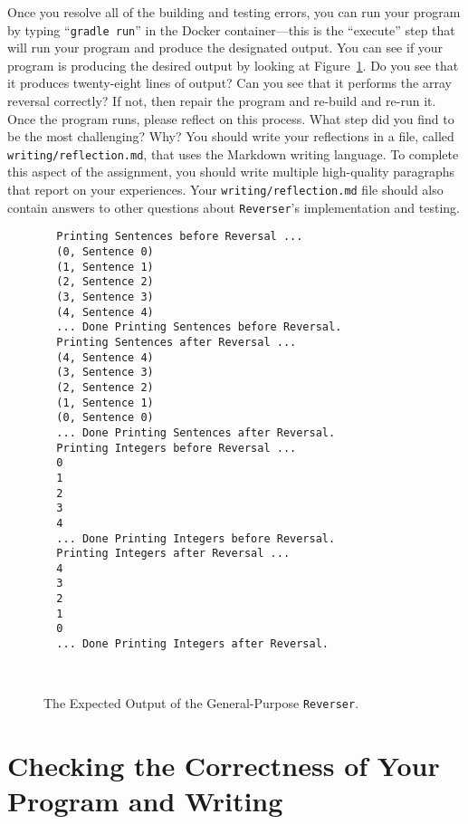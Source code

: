 \documentclass[11pt]{article}
\newcommand{\mainprogram}{\lstinline{Reverser}}
\newcommand{\mainprogramoutput}{twenty-eight}
\newcommand{\reflection}{\lstinline{writing/reflection.md}}
\newcommand{\gradlerun}{\command{gradle run}}
\newcommand{\command}[1]{``\lstinline{#1}''}
\begin{document}

Once you resolve all of the building and testing errors, you can run your
program by typing \gradlerun{} in the Docker container---this is the ``execute''
step that will run your program and produce the designated output. You can see
if your program is producing the desired output by looking at
Figure~\ref{fig:output}. Do you see that it produces \mainprogramoutput{} lines
of output? Can you see that it performs the array reversal correctly? If not,
then repair the program and re-build and re-run it. Once the program runs,
please reflect on this process. What step did you find to be the most
challenging? Why? You should write your reflections in a file, called
\reflection{}, that uses the Markdown writing language. To complete this aspect
of the assignment, you should write multiple high-quality paragraphs that report
on your experiences. Your \reflection{} file should also contain answers to
other questions about \mainprogram{}'s implementation and testing.

\begin{figure}[t]
  \centering
  \begin{verbatim}
  Printing Sentences before Reversal ...
  (0, Sentence 0)
  (1, Sentence 1)
  (2, Sentence 2)
  (3, Sentence 3)
  (4, Sentence 4)
  ... Done Printing Sentences before Reversal.
  Printing Sentences after Reversal ...
  (4, Sentence 4)
  (3, Sentence 3)
  (2, Sentence 2)
  (1, Sentence 1)
  (0, Sentence 0)
  ... Done Printing Sentences after Reversal.
  Printing Integers before Reversal ...
  0
  1
  2
  3
  4
  ... Done Printing Integers before Reversal.
  Printing Integers after Reversal ...
  4
  3
  2
  1
  0
  ... Done Printing Integers after Reversal.
  \end{verbatim}
  \vspace*{-.25in}
  \caption{The Expected Output of the General-Purpose \mainprogram{}.}~\label{fig:output}
  \vspace*{-.25in}
\end{figure}

\section*{Checking the Correctness of Your Program and Writing}
\end{document}

